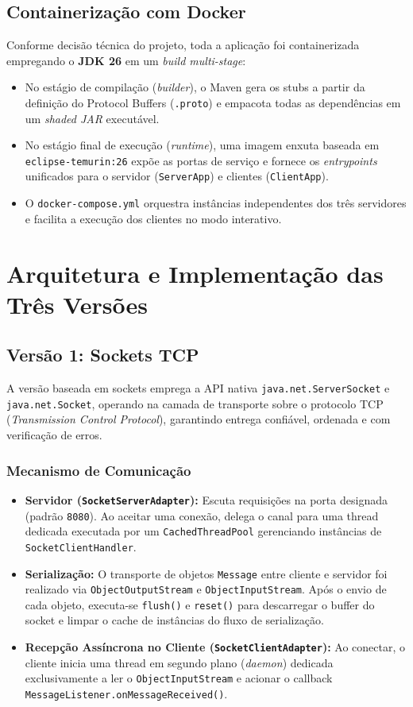 \documentclass[12pt,a4paper]{article}
\begin{document}
\subsection{Containerização com Docker}
Conforme decisão técnica do projeto, toda a aplicação foi containerizada empregando o \textbf{JDK 26} em um \textit{build multi-stage}:
\begin{itemize}
    \item No estágio de compilação (\textit{builder}), o Maven gera os stubs a partir da definição do Protocol Buffers (\texttt{.proto}) e empacota todas as dependências em um \textit{shaded JAR} executável.
    \item No estágio final de execução (\textit{runtime}), uma imagem enxuta baseada em \texttt{eclipse-temurin:26} expõe as portas de serviço e fornece os \textit{entrypoints} unificados para o servidor (\texttt{ServerApp}) e clientes (\texttt{ClientApp}).
    \item O \texttt{docker-compose.yml} orquestra instâncias independentes dos três servidores e facilita a execução dos clientes no modo interativo.
\end{itemize}

\section{Arquitetura e Implementação das Três Versões}

\subsection{Versão 1: Sockets TCP}
A versão baseada em sockets emprega a API nativa \texttt{java.net.ServerSocket} e \texttt{java.net.Socket}, operando na camada de transporte sobre o protocolo TCP (\textit{Transmission Control Protocol}), garantindo entrega confiável, ordenada e com verificação de erros.

\subsubsection{Mecanismo de Comunicação}
\begin{itemize}
    \item \textbf{Servidor (\texttt{SocketServerAdapter}):} Escuta requisições na porta designada (padrão \texttt{8080}). Ao aceitar uma conexão, delega o canal para uma thread dedicada executada por um \texttt{CachedThreadPool} gerenciando instâncias de \texttt{SocketClientHandler}.
    \item \textbf{Serialização:} O transporte de objetos \texttt{Message} entre cliente e servidor foi realizado via \texttt{ObjectOutputStream} e \texttt{ObjectInputStream}. Após o envio de cada objeto, executa-se \texttt{flush()} e \texttt{reset()} para descarregar o buffer do socket e limpar o cache de instâncias do fluxo de serialização.
    \item \textbf{Recepção Assíncrona no Cliente (\texttt{SocketClientAdapter}):} Ao conectar, o cliente inicia uma thread em segundo plano (\textit{daemon}) dedicada exclusivamente a ler o \texttt{ObjectInputStream} e acionar o callback \texttt{MessageListener.onMessageReceived()}.
\end{itemize}
\end{document}
